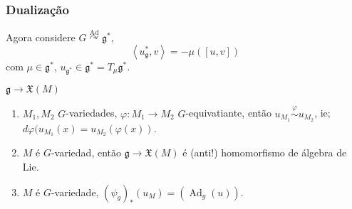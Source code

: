 \subsubsection{Dualização}
Agora considere $G\overset{\operatorname{Ad}}{\curvearrowright }\mathfrak{g}^*$,
\[\left<u_{\mathfrak{g}}^*,v\right> =-\mu\left( [u,v] \right) \]
com $\mu\in\mathfrak{g}^*$, $u_{\mathfrak{g}^*}\in\mathfrak{g}^*=T_\mu\mathfrak{g}^*$.

\begin{question}
	$\mathfrak{g} \to \mathfrak{X}(M)$
\end{question}

\begin{prop}\leavevmode 
	\begin{enumerate}
		\item $M_1,M_2$ $G$-variedades, $ \varphi:M_1\to M_2$ $G$-equivatiante, então $u_{M_1}\overset{\varphi}{\sim}u_{M_2}$, ie; $d\varphi (u_{M_1}(x)=u_{M_2}(\varphi(x))$.

		\item $M$ é $G$-variedad, então $\mathfrak{g} \to \mathfrak{X}(M)$ é (anti!) homomorfismo de álgebra de Lie.

		\item $M$  é $G$-variedade, $(\psi_g)_*(u_M)=(\operatorname{Ad}_g(u))$.
	\end{enumerate}
\end{prop}

